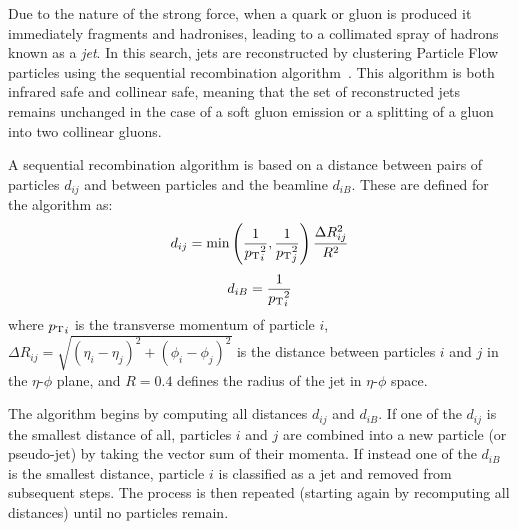 Due to the nature of the strong force, when a quark or gluon is produced it 
immediately fragments and hadronises, leading to a collimated spray of hadrons 
known as a \textit{jet}. In this search, jets are reconstructed by clustering 
Particle Flow particles using the \antikt sequential recombination 
algorithm~\cite{antikt}. This algorithm is both infrared safe and collinear 
safe, 
meaning that the set of reconstructed jets remains unchanged in the case of a 
soft gluon emission or a splitting of a gluon into two collinear gluons. 


A sequential recombination algorithm is based on a distance between pairs of 
particles $d_{ij}$ and between particles and the beamline $d_{iB}$. These are 
defined for the \antikt algorithm as:
\begin{equation}
d_{ij} = \mathrm{min} \left( \frac{1}{{p_{\text T}}_i^2}, \frac{1}{{p_{\text T}}_j^2} \right) 
\frac{\Delta R_{ij}^2}{R^2}
\end{equation}
\begin{equation}
d_{iB} = \frac{1}{{p_{\text T}}_i^2}
\end{equation}
where ${p_{\text T}}_i$ is the transverse momentum of particle $i$, 
$\Delta R_{ij}=\sqrt{(\eta_i - \eta_j)^2 + (\phi_i - \phi_j)^2}$ is the 
distance between particles $i$ and $j$ in the {$\eta$-$\phi$} plane, and 
$R=0.4$ defines the radius of the jet in {$\eta$-$\phi$} space.

The algorithm begins by computing all distances $d_{ij}$ and $d_{iB}$. If one 
of the $d_{ij}$ is the smallest distance of all, particles $i$ and $j$ are 
combined into a new particle (or pseudo-jet) by taking the vector sum of their 
momenta. 
If instead one of the $d_{iB}$ is the smallest distance, particle $i$ is 
classified as a jet and removed from subsequent steps. The process is then 
repeated (starting again by recomputing all distances) until no particles 
remain.


